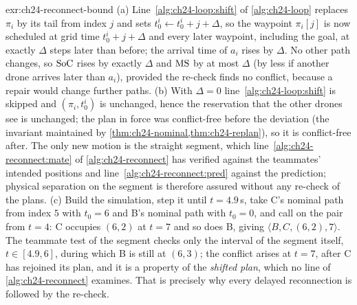 \begin{solution}{exr:ch24-reconnect-bound}
(a) Line~\ref{alg:ch24-loop:shift} of \cref{alg:ch24-loop} replaces $\pi_i$ by its tail from index $j$ and sets $t_0^i \gets t_0^i + j + \Delta$, so the waypoint $\pi_i[j]$ is now scheduled at grid time $t_0^i + j + \Delta$ and every later waypoint, including the goal, at exactly $\Delta$ steps later than before; the arrival time of $a_i$ rises by $\Delta$. No other path changes, so $\mathrm{SoC}$ rises by exactly $\Delta$ and $\mathrm{MS}$ by at most $\Delta$ (by less if another drone arrives later than $a_i$), provided the re-check finds no conflict, because a repair would change further paths. (b) With $\Delta = 0$ line~\ref{alg:ch24-loop:shift} is skipped and $(\pi_i, t_0^i)$ is unchanged, hence the reservation that the other drones see is unchanged; the plan in force was conflict-free before the deviation (the invariant maintained by \cref{thm:ch24-nominal,thm:ch24-replan}), so it is conflict-free after. The only new motion is the straight segment, which line~\ref{alg:ch24-reconnect:mate} of \cref{alg:ch24-reconnect} has verified against the teammates' intended positions and line~\ref{alg:ch24-reconnect:pred} against the prediction; physical separation on the segment is therefore assured without any re-check of the plans. (c) Build the simulation, step it until $t = 4.9$\,s, take C's nominal path from index $5$ with $t_0 = 6$ and B's nominal path with $t_0 = 0$, and call  on the pair from $t = 4$: C occupies $(6,2)$ at $t = 7$ and so does B, giving $\langle B, C, (6,2), 7\rangle$. The teammate test of the segment checks only the interval of the segment itself, $t \in [4.9, 6]$, during which B is still at $(6,3)$; the conflict arises at $t = 7$, after C has rejoined its plan, and it is a property of the \emph{shifted plan}, which no line of \cref{alg:ch24-reconnect} examines. That is precisely why every delayed reconnection is followed by the re-check.
\end{solution}

